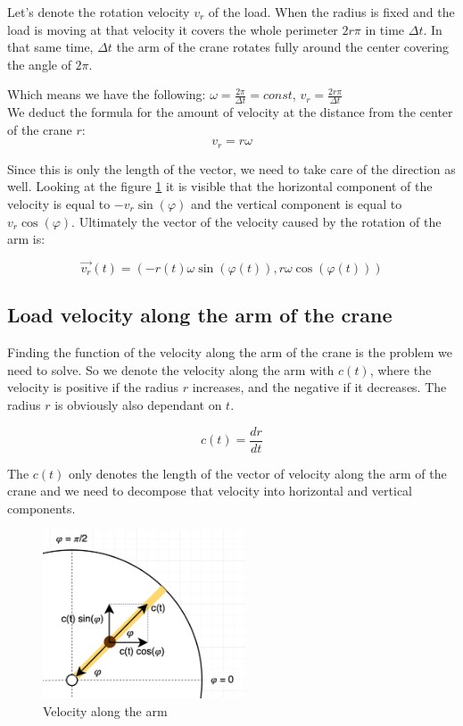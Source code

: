 \documentclass[11pt]{article}
\begin{document}
Let's denote the rotation velocity $v_r$ of the load. When the radius is fixed and the load is moving at that velocity it covers the whole perimeter $2r\pi$ in time $\Delta t$. In that same time, $\Delta t$ the arm of the crane rotates fully around the center covering the angle of $2\pi$.

Which means we have the following: \( \omega = \frac{2\pi}{\Delta t} = const \), \( v_r = \frac{2r\pi}{\Delta t} \)\\

We deduct the formula for the amount of velocity at the distance from the center of the crane $r$:
\[ v_r = r\omega \]

Since this is only the length of the vector, we need to take care of the direction as well. Looking at the figure \ref{fig:rot_velocity} it is visible that the horizontal component of the velocity is equal to $-v_r\sin(\varphi)$ and the vertical component is equal to $v_r\cos(\varphi)$. Ultimately the vector of the velocity caused by the rotation of the arm is:

\[ \vec{v_r}(t) = (-r(t)\omega \sin(\varphi(t)), r\omega \cos(\varphi(t))) \]

\subsection{Load velocity along the arm of the crane}

Finding the function of the velocity along the arm of the crane is the problem we need to solve. So we denote the velocity along the arm with $c(t)$, where the velocity is positive if the radius $r$ increases, and the negative if it decreases. The radius $r$ is obviously also dependant on $t$.

\[ c(t) = \frac{dr}{dt} \]

The $c(t)$ only denotes the length of the vector of velocity along the arm of the crane and we need to decompose that velocity into horizontal and vertical components.

\begin{figure}[H]
\centering
\includegraphics[width=6cm]{img/arm_velocity.jpg}
\caption{Velocity along the arm}
\label{fig:rot_velocity}
\end{figure}
\end{document}
